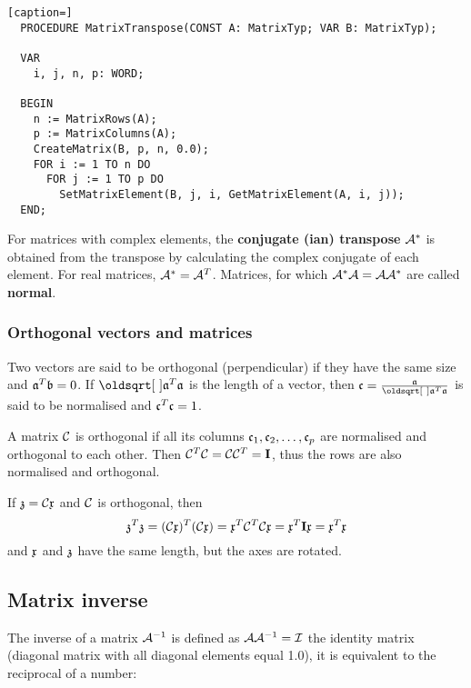 \begin{refsection}
\begin{lstlisting}[caption=]
  PROCEDURE MatrixTranspose(CONST A: MatrixTyp; VAR B: MatrixTyp);

  VAR
    i, j, n, p: WORD;

  BEGIN
    n := MatrixRows(A);
    p := MatrixColumns(A);
    CreateMatrix(B, p, n, 0.0);
    FOR i := 1 TO n DO
      FOR j := 1 TO p DO
        SetMatrixElement(B, j, i, GetMatrixElement(A, i, j));
  END;
\end{lstlisting}

For matrices with complex elements, the \textbf{conjugate (ian) transpose} \( \mathcal{A}^* \) is obtained from the transpose by calculating the complex conjugate of each element. For real matrices, \( \mathcal{A}^* = \mathcal{A}^T \). Matrices, for which \( \mathcal{A}^* \mathcal{A} = \mathcal{A} \mathcal{A}^* \) are called \textbf{normal}.

\subsubsection{Orthogonal vectors and matrices}

Two vectors are said to be orthogonal (perpendicular) if they have the same size and \(\mathfrak{a}^T\mathfrak{b} = 0 \). If \(\sqrt{\AbsVec{a}^T \AbsVec{a}} \) is the length of a vector, then \(\AbsVec{c} = \frac{\AbsVec{a}}{\sqrt{\AbsVec{a}^T \AbsVec{a}}} \) is said to be normalised and \(\mathfrak{c}^T \mathfrak{c} = 1 \).

A matrix \(\mathcal{C} \) is orthogonal if all its columns \(\mathfrak{c}_1, \mathfrak{c}_2, \ldots, \mathfrak{c}_p \) are normalised and orthogonal to each other. Then \(\mathcal{C}^T\mathcal{C} = \mathcal{C}\mathcal{C}^T = \mathbf{I} \), thus the rows are also normalised and orthogonal.

If \(\mathfrak{z} = \mathcal{C}\mathfrak{x} \) and \(\mathcal{C} \) is orthogonal, then
\begin{equation}
  \mathfrak{z}^T\mathfrak{z} = (\mathcal{C}\mathfrak{x})^T (\mathcal{C}\mathfrak{x}) =
    \mathfrak{x}^T\mathcal{C}^T\mathcal{C}\mathfrak{x} = \mathfrak{x}^T\mathbf{I}\mathfrak{x} = \mathfrak{x}^T\mathfrak{x}
\end{equation}
and \(\mathfrak{x} \) and \(\mathfrak{z} \) have the same length, but the axes are rotated.

\subsection{Matrix inverse}
The inverse of a matrix \(\mathcal{A}^{-1} \) is defined as \(\mathcal{A} \mathcal{A}^{-1} = \mathcal{I} \) the identity matrix (diagonal matrix with all diagonal elements equal 1.0), it is equivalent to the reciprocal of a number:


\end{refsection}
